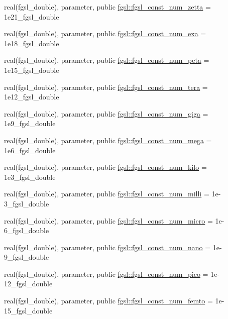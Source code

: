 \begin{DoxyCompactItemize}
real(fgsl\+\_\+double), parameter, public \hyperlink{namespacefgsl_adbd48c7f748a96cfbe32705159c06b84}{fgsl\+::fgsl\+\_\+const\+\_\+num\+\_\+zetta} = 1e21\+\_\+fgsl\+\_\+double
\item 
real(fgsl\+\_\+double), parameter, public \hyperlink{namespacefgsl_a0d6878f336ffcf4aaf3af66bbdfc5a9b}{fgsl\+::fgsl\+\_\+const\+\_\+num\+\_\+exa} = 1e18\+\_\+fgsl\+\_\+double
\item 
real(fgsl\+\_\+double), parameter, public \hyperlink{namespacefgsl_aa124eb86407291ed14158b0802d02029}{fgsl\+::fgsl\+\_\+const\+\_\+num\+\_\+peta} = 1e15\+\_\+fgsl\+\_\+double
\item 
real(fgsl\+\_\+double), parameter, public \hyperlink{namespacefgsl_a6b39aa71fe2d5af7fa748710f70afd58}{fgsl\+::fgsl\+\_\+const\+\_\+num\+\_\+tera} = 1e12\+\_\+fgsl\+\_\+double
\item 
real(fgsl\+\_\+double), parameter, public \hyperlink{namespacefgsl_a27758acec15033cf3c0918d8d9c55eca}{fgsl\+::fgsl\+\_\+const\+\_\+num\+\_\+giga} = 1e9\+\_\+fgsl\+\_\+double
\item 
real(fgsl\+\_\+double), parameter, public \hyperlink{namespacefgsl_a3783a70eb7db5888129ccf2094415129}{fgsl\+::fgsl\+\_\+const\+\_\+num\+\_\+mega} = 1e6\+\_\+fgsl\+\_\+double
\item 
real(fgsl\+\_\+double), parameter, public \hyperlink{namespacefgsl_a921e5869ad16238cb472943f2486d0ac}{fgsl\+::fgsl\+\_\+const\+\_\+num\+\_\+kilo} = 1e3\+\_\+fgsl\+\_\+double
\item 
real(fgsl\+\_\+double), parameter, public \hyperlink{namespacefgsl_a3fb5efe0ae67e7937ba05e8f184e2d35}{fgsl\+::fgsl\+\_\+const\+\_\+num\+\_\+milli} = 1e-\/3\+\_\+fgsl\+\_\+double
\item 
real(fgsl\+\_\+double), parameter, public \hyperlink{namespacefgsl_aa7d0f5804ffc72dc0ecddbee234cd51d}{fgsl\+::fgsl\+\_\+const\+\_\+num\+\_\+micro} = 1e-\/6\+\_\+fgsl\+\_\+double
\item 
real(fgsl\+\_\+double), parameter, public \hyperlink{namespacefgsl_a18d57365a461c2adc8f4e0ddb4c690d6}{fgsl\+::fgsl\+\_\+const\+\_\+num\+\_\+nano} = 1e-\/9\+\_\+fgsl\+\_\+double
\item 
real(fgsl\+\_\+double), parameter, public \hyperlink{namespacefgsl_a8a137e17b45fbfd8a37ef012e9b522ab}{fgsl\+::fgsl\+\_\+const\+\_\+num\+\_\+pico} = 1e-\/12\+\_\+fgsl\+\_\+double
\item 
real(fgsl\+\_\+double), parameter, public \hyperlink{namespacefgsl_a3ab8d745c9129ec33f7556e68234b60b}{fgsl\+::fgsl\+\_\+const\+\_\+num\+\_\+femto} = 1e-\/15\+\_\+fgsl\+\_\+double

\end{DoxyCompactItemize}
